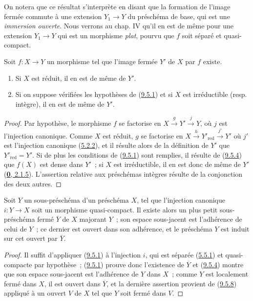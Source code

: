On notera que ce résultat s'interprète en disant que la formation de l'image
fermée commute à une extension $Y_1\to Y$ du préschéma de base, qui est une
\emph{immersion ouverte}. Nous verrons au chap. IV qu'il en est de même pour
une extension $Y_1\to Y$ qui est un morphisme \emph{plat}, pourvu que $f$
soit séparé et quasi-compact.

\begin{proposition}[9.5.9]
\label{I.9.5.9-fr}
Soit $f:X\to Y$ un morphisme tel que l'image fermée $Y'$ de $X$ par $f$
existe.
\begin{enumerate}
  \item[\textup{(i)}] Si $X$ est réduit, il en est de même de $Y'$.
  \item[\textup{(ii)}] Si on suppose vérifiées les hypothèses de
    (\hyperref[I.9.5.1-fr]{9.5.1}) et si $X$ est irréductible \textup{(resp.}
    intègre), il en est de même de $Y'$.
\end{enumerate}
\end{proposition}

\begin{proof}
Par hypothèse, le morphisme $f$ se factorise en
$X\xrightarrow{g}Y'\xrightarrow{j}Y$, où $j$ est l'injection canonique.
Comme $X$ est réduit, $g$ se factorise en
$X\xrightarrow{h}Y'_{\mathrm{red}}\xrightarrow{j'}Y'$ où $j'$ est
l'injection canonique (\hyperref[I.5.2.2-fr]{5.2.2}), et il résulte alors de
la définition de $Y'$ que $Y'_{\mathrm{red}}=Y'$. Si de plus les conditions
de (\hyperref[I.9.5.1-fr]{9.5.1}) sont remplies, il résulte de
(\hyperref[I.9.5.4-fr]{9.5.4}) que $f(X)$ est dense dans $Y'$~; si $X$ est
irréductible, il en est donc de même de $Y'$
(\hyperref[0.2.1.5-fr]{\textbf{0}, 2.1.5}). L'assertion relative aux préschémas
intègres résulte de la conjonction des deux autres.
\end{proof}

\begin{proposition}[9.5.10]
\label{I.9.5.10-fr}
Soit $Y$ un sous-préschéma d'un préschéma $X$, tel que l'injection canonique
$i:Y\to X$ soit un morphisme quasi-compact. Il existe alors un plus petit
sous-préschéma fermé $\overline{Y}$ de $X$ majorant $Y$~; son espace
sous-jacent est l'adhérence de celui de $Y$~; ce dernier est ouvert dans son
adhérence, et le préschéma $Y$ est induit sur cet ouvert par $\overline{Y}$.
\end{proposition}

\begin{proof}
Il suffit d'appliquer (\hyperref[I.9.5.1-fr]{9.5.1}) à l'injection $i$, qui
est séparée (\hyperref[I.5.5.1-fr]{5.5.1}) et quasi-compacte par hypothèse~;
(\hyperref[I.9.5.1-fr]{9.5.1}) prouve donc l'existence de $\overline{Y}$ et
(\hyperref[I.9.5.4-fr]{9.5.4}) montre que son espace sous-jacent est
l'adhérence de $Y$ dans $X$~; comme $Y$ est localement fermé dans $X$, il
est ouvert dans $\overline{Y}$, et la dernière assertion provient de
(\hyperref[I.9.5.8-fr]{9.5.8}) appliqué à un ouvert $V$ de $X$ tel que $Y$
soit fermé dans $V$.
\end{proof}

